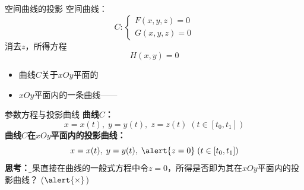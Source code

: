 \begin{frame}{空间曲线的投影}
	\linespread{1.2}\pause 
	空间曲线：
	$$C:\left\{\begin{array}{l}
		F(x,y,z)=0\\ G(x,y,z)=0
	\end{array}\right.$$\pause 
	消去$z$，所得方程
	$$H(x,y)=0$$\pause 
	\vspace{-1em}
	\begin{itemize}
	  \item 曲线$C$关于$xOy$平面的\pause 
	  \item $xOy$平面内的一条曲线——
	\end{itemize}
\end{frame}

\begin{frame}{参数方程与投影曲线}
	\linespread{1.2}\pause 
	{\bf 曲线$C$：}
	$$x=x(t),\;y=y(t),\;z=z(t)\;(t\in[t_0,t_1])$$\pause 
	{\bf 曲线$C$在$xOy$平面内的投影曲线：}
	$$x=x(t),\;y=y(t),\;\alert{z=0}\;(t\in[t_0,t_1])$$\pause 
	{\bf 思考：}{\b 如果直接在曲线的一般式方程中令$z=0$，所得是否即为其在$xOy$平面内的投影曲线？}\pause
	($\alert{\times}$)
\end{frame}


